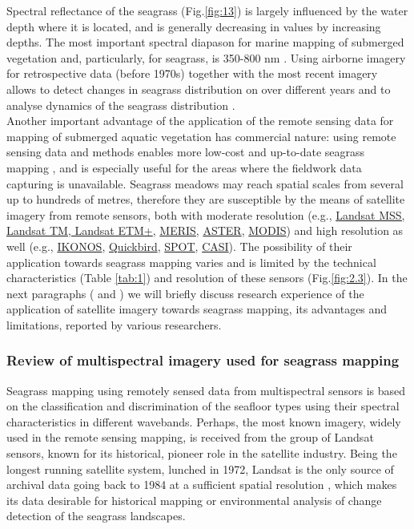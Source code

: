 \documentclass[10pt, a4paper]{article}
\begin{document}
Spectral reflectance of the seagrass  (Fig.\ref{fig:13}) is largely influenced by the water
depth where it is located, and is generally decreasing in values by increasing depths.
The most important spectral diapason for marine mapping of submerged vegetation
and, particularly, for seagrass, is 350-800 nm \cite{Barille09}\label{Barille09}.
Using airborne imagery for retrospective data (before 1970s) together with the most
recent imagery allows to detect changes in seagrass distribution on over different years
and to analyse dynamics of the seagrass distribution \cite{Ball09}\label{Ball09}. \\
Another important advantage of the application of the remote sensing data for mapping of submerged aquatic vegetation has
commercial nature: using remote sensing data and methods enables more low-cost and up-to-date
seagrass mapping \cite{Mumby99}\label{Mumby99}, and is especially useful for the areas where the fieldwork data
capturing is unavailable.
Seagrass meadows may reach spatial scales from several up to hundreds of metres, therefore they are
susceptible by the means of satellite imagery from remote sensors, both with moderate resolution
(e.g., \href{http://landsat.gsfc.nasa.gov/}{Landsat MSS, Landsat TM, Landsat ETM+}, \href{http://envisat.esa.int/instruments/meris/}{MERIS}, \href{http://asterweb.jpl.nasa.gov/}{ASTER}, \href{http://modis.gsfc.nasa.gov/}{MODIS}) and high resolution as
well (e.g., \href{http://www.satimagingcorp.com/gallery-ikonos.html}{IKONOS}, \href{http://www.digitalglobe.com/index.php/85/QuickBird}{Quickbird}, \href{http://www.spotimage.fr/}{SPOT}, \href{http://www.itres.com/products/imagers/casi550}{CASI}). The possibility of their application towards seagrass mapping varies and is limited by the technical characteristics (Table \ref{tab:1}) and resolution of these sensors  (Fig.\ref{fig:2.3}).
In the next paragraphs ( and ) we will briefly discuss research experience of the application of satellite imagery towards seagrass mapping, its advantages and limitations, reported by various researchers.

\subsubsection[Review of multispectral imagery...]{Review of multispectral imagery used for seagrass mapping}\label{sec:2.4.1}
Seagrass mapping using remotely sensed data from multispectral sensors is based on the classification
and discrimination of the seafloor types using their spectral characteristics in different wavebands.
Perhaps, the most known imagery, widely used in the remote sensing mapping, is received from the
group of Landsat sensors, known for its historical, pioneer role in the satellite industry.
Being the longest running satellite system, lunched in 1972, Landsat is the only source of archival
data going back to 1984 at a sufficient spatial resolution \cite{Dekker05b}\label{Dekker05b}, which makes its data
desirable for historical mapping or environmental analysis of change detection of the seagrass
landscapes.
\end{document}

